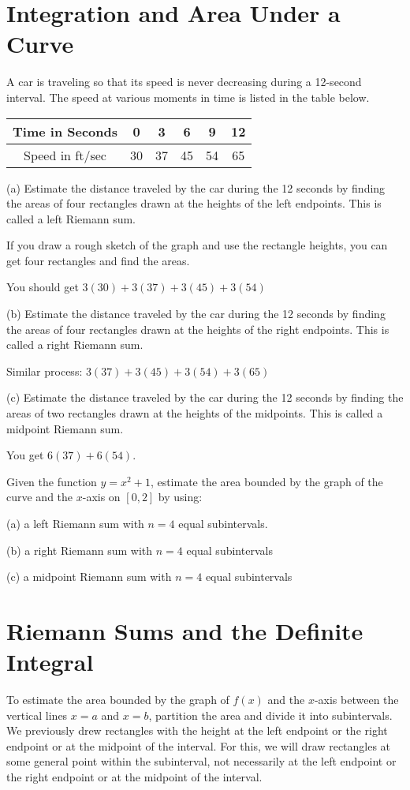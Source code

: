 \documentclass[../bccalc.tex]{subfiles}
\begin{document}
\section{Integration and Area Under a Curve}
\begin{example}
    A car is traveling so that its speed is never decreasing during a 12-second interval. The speed at various moments in time is listed in the table below.
    \begin{center}
        \begin{tabular}{|c|c|c|c|c|c|}
        \hline 
        Time in Seconds & 0 & 3 & 6 & 9 & 12\\
        \hline 
        Speed in ft/sec & 30 & 37 & 45 & 54 & 65\\
        \hline
    \end{tabular}
    \end{center}

    (a) Estimate the distance traveled by the car during the 12 seconds by finding the areas of four rectangles drawn at the heights of the left endpoints. This is called a left Riemann sum.

    If you draw a rough sketch of the graph and use the rectangle heights, you can get four rectangles and find the areas.

    You should get $3(30)+3(37)+3(45)+3(54)$

    (b) Estimate the distance traveled by the car during the 12 seconds by finding the areas of four rectangles drawn at the heights of the right endpoints. This is called a right Riemann sum.

    Similar process: $3(37)+3(45)+3(54)+3(65)$

    (c) Estimate the distance traveled by the car during the 12 seconds by finding the areas of two rectangles drawn at the heights of the midpoints. This is called a midpoint Riemann sum.

    You get $6(37)+6(54)$.
\end{example}

\ex Given the function $y=x^2+1$, estimate the area bounded by the graph of the curve and the $x$-axis on $[0,2]$ by using:

(a) a left Riemann sum with $n=4$ equal subintervals.

(b) a right Riemann sum with $n=4$ equal subintervals

(c) a midpoint Riemann sum with $n=4$ equal subintervals

\section{Riemann Sums and the Definite Integral}
To estimate the area bounded by the graph of $f(x)$ and the $x$-axis between the vertical lines $x=a$ and $x=b$, partition the area and divide it into subintervals.
We previously drew rectangles with the height at the left endpoint or the right endpoint or at the midpoint of the interval. For this, we will draw rectangles at some general point within the subinterval, not necessarily at the left endpoint or the right endpoint or at the midpoint of the interval.
\end{document}
